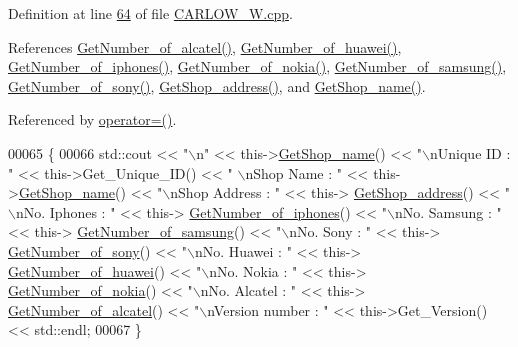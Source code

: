 Definition at line \hyperlink{_c_a_r_l_o_w___w_8cpp_source_l00064}{64} of file \hyperlink{_c_a_r_l_o_w___w_8cpp_source}{C\+A\+R\+L\+O\+W\+\_\+\+W.\+cpp}.



References \hyperlink{_c_a_r_l_o_w___w_8cpp_source_l00075}{Get\+Number\+\_\+of\+\_\+alcatel()}, \hyperlink{_c_a_r_l_o_w___w_8cpp_source_l00091}{Get\+Number\+\_\+of\+\_\+huawei()}, \hyperlink{_c_a_r_l_o_w___w_8cpp_source_l00115}{Get\+Number\+\_\+of\+\_\+iphones()}, \hyperlink{_c_a_r_l_o_w___w_8cpp_source_l00083}{Get\+Number\+\_\+of\+\_\+nokia()}, \hyperlink{_c_a_r_l_o_w___w_8cpp_source_l00107}{Get\+Number\+\_\+of\+\_\+samsung()}, \hyperlink{_c_a_r_l_o_w___w_8cpp_source_l00099}{Get\+Number\+\_\+of\+\_\+sony()}, \hyperlink{_c_a_r_l_o_w___w_8cpp_source_l00131}{Get\+Shop\+\_\+address()}, and \hyperlink{_c_a_r_l_o_w___w_8cpp_source_l00123}{Get\+Shop\+\_\+name()}.



Referenced by \hyperlink{_c_a_r_l_o_w___w_8h_source_l00075}{operator=()}.


\begin{DoxyCode}
00065 \{
00066    std::cout << \textcolor{stringliteral}{"\(\backslash\)n"} <<  this->\hyperlink{class_c_a_r_l_o_w___w_a68235a63964645c525620053a33de863}{GetShop\_name}() << \textcolor{stringliteral}{"\(\backslash\)nUnique ID : "} << this->Get\_Unique\_ID() << \textcolor{stringliteral}{"
      \(\backslash\)nShop Name : "}  << this->\hyperlink{class_c_a_r_l_o_w___w_a68235a63964645c525620053a33de863}{GetShop\_name}() << \textcolor{stringliteral}{"\(\backslash\)nShop Address : "} << this->
      \hyperlink{class_c_a_r_l_o_w___w_af48a2f69706be684115758820ce79ddd}{GetShop\_address}() << \textcolor{stringliteral}{"\(\backslash\)nNo. Iphones : "} << this->
      \hyperlink{class_c_a_r_l_o_w___w_a50395c707116ea1176743ed98c6b1f76}{GetNumber\_of\_iphones}() << \textcolor{stringliteral}{"\(\backslash\)nNo. Samsung : "} << this->
      \hyperlink{class_c_a_r_l_o_w___w_aecc697b6d017d88f2bdbe3cea2bf3496}{GetNumber\_of\_samsung}() << \textcolor{stringliteral}{"\(\backslash\)nNo. Sony : "} << this->
      \hyperlink{class_c_a_r_l_o_w___w_a6d31219dac9b4d8842e14b7414ed286e}{GetNumber\_of\_sony}() << \textcolor{stringliteral}{"\(\backslash\)nNo. Huawei : "} << this->
      \hyperlink{class_c_a_r_l_o_w___w_aea38b51a44cda35a01beb7d45fa7a2a4}{GetNumber\_of\_huawei}() << \textcolor{stringliteral}{"\(\backslash\)nNo. Nokia : "} << this->
      \hyperlink{class_c_a_r_l_o_w___w_a4e3a644ee69bc4bc4ab3feac1493192b}{GetNumber\_of\_nokia}() << \textcolor{stringliteral}{"\(\backslash\)nNo. Alcatel : "} << this->
      \hyperlink{class_c_a_r_l_o_w___w_ae7ab8852e5eeff1c2cd397126fbac0e7}{GetNumber\_of\_alcatel}() << \textcolor{stringliteral}{"\(\backslash\)nVersion number : "} << this->Get\_Version() << std::endl;
00067 \}
\end{DoxyCode}


